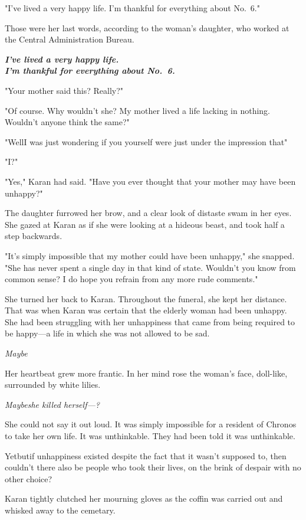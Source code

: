 "I've lived a very happy life. I'm thankful for everything about No.~6."

Those were her last words, according to the woman's daughter, who worked
at the Central Administration Bureau.

\textbf{\emph{I've lived a very happy life.\\I'm thankful for everything about No.~6.}}

"Your mother said this? Really?"

"Of course. Why wouldn't she? My mother lived a life lacking in nothing.
Wouldn't anyone think the same?"

"Well\el I was just wondering if you yourself were just under the
impression that\el "

"I?"

"Yes," Karan had said. "Have you ever thought that your mother may have
been unhappy?"

The daughter furrowed her brow, and a clear look of distaste swam in her
eyes. She gazed at Karan as if she were looking at a hideous beast, and
took half a step backwards.

"It's simply impossible that my mother could have been unhappy," she
snapped. "She has never spent a single day in that kind of state.
Wouldn't you know from common sense? I do hope you refrain from any more
rude comments."

She turned her back to Karan. Throughout the funeral, she kept her
distance. That was when Karan was certain that the elderly woman had
been unhappy. She had been struggling with her unhappiness that came
from being required to be happy---a life in which she was not allowed to
be sad.

\emph{Maybe\el }

Her heartbeat grew more frantic. In her mind rose the woman's face,
doll-like, surrounded by white lilies.

\emph{Maybe\el she killed herself---?}

She could not say it out loud. It was simply impossible for a resident
of Chronos to take her own life. It was unthinkable. They had been told
it was unthinkable.

Yet\el but\el if unhappiness existed despite the fact that it wasn't
supposed to, then couldn't there also be people who took their lives, on
the brink of despair with no other choice?

Karan tightly clutched her mourning gloves as the coffin was carried out
and whisked away to the cemetary.

